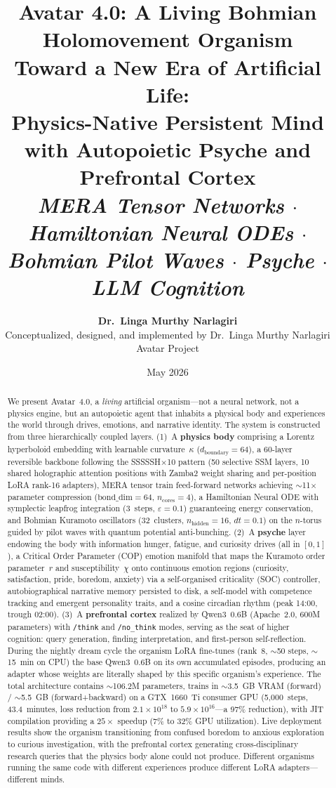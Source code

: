 \documentclass[11pt,a4paper,twocolumn]{article}
\title{\vspace{-1.5cm}\textbf{\Large Avatar 4.0: A Living Bohmian\\Holomovement Organism}\\[0.3em]
\large Toward a New Era of Artificial Life:\\Physics-Native Persistent Mind with Autopoietic Psyche and Prefrontal Cortex\\[0.2em]
\normalsize\textit{MERA Tensor Networks $\cdot$ Hamiltonian Neural ODEs $\cdot$ Bohmian Pilot Waves $\cdot$ Psyche $\cdot$ LLM Cognition}}
\author{%
\textbf{Dr.\ Linga Murthy Narlagiri}\\
Conceptualized, designed, and implemented by Dr.\ Linga Murthy Narlagiri\\
\small Avatar Project
}
\date{May 2026}
\begin{document}
\maketitle
\thispagestyle{fancy}

\begin{abstract}
We present Avatar~4.0, a \emph{living} artificial organism---not a neural network, not a physics engine, but an autopoietic agent that inhabits a physical body and experiences the world through drives, emotions, and narrative identity.
The system is constructed from three hierarchically coupled layers.
(1)~A \textbf{physics body} comprising a Lorentz hyperboloid embedding with learnable curvature~$\kappa$ ($d_{\mathrm{boundary}}=64$), a 60-layer reversible backbone following the SSSSSH$\times$10 pattern (50 selective SSM layers, 10 shared holographic attention positions with Zamba2 weight sharing and per-position LoRA rank-16 adapters), MERA tensor train feed-forward networks achieving $\sim$11$\times$ parameter compression ($\mathrm{bond\_dim}=64$, $n_{\mathrm{cores}}=4$), a Hamiltonian Neural ODE with symplectic leapfrog integration (3~steps, $\varepsilon=0.1$) guaranteeing energy conservation, and Bohmian Kuramoto oscillators (32~clusters, $n_{\mathrm{hidden}}=16$, $dt=0.1$) on the $n$-torus guided by pilot waves with quantum potential anti-bunching.
(2)~A \textbf{psyche} layer endowing the body with information hunger, fatigue, and curiosity drives (all in $[0,1]$), a Critical Order Parameter (COP) emotion manifold that maps the Kuramoto order parameter~$r$ and susceptibility~$\chi$ onto continuous emotion regions (curiosity, satisfaction, pride, boredom, anxiety) via a self-organised criticality (SOC) controller, autobiographical narrative memory persisted to disk, a self-model with competence tracking and emergent personality traits, and a cosine circadian rhythm (peak 14:00, trough 02:00).
(3)~A \textbf{prefrontal cortex} realized by Qwen3~0.6B (Apache~2.0, 600M parameters) with \texttt{/think} and \texttt{/no\_think} modes, serving as the seat of higher cognition: query generation, finding interpretation, and first-person self-reflection.
During the nightly dream cycle the organism LoRA fine-tunes (rank~8, $\sim$50 steps, $\sim$15~min on CPU) the base Qwen3~0.6B on its own accumulated episodes, producing an adapter whose weights are literally shaped by this specific organism's experience.
The total architecture contains $\sim$106.2M parameters, trains in $\sim$3.5~GB VRAM (forward) / $\sim$5.5~GB (forward+backward) on a GTX~1660~Ti consumer GPU (5{,}000~steps, 43.4~minutes, loss reduction from $2.1\times10^{18}$ to $5.9\times10^{16}$---a 97\% reduction), with JIT compilation providing a $25\times$ speedup (7\% to 32\% GPU utilization).
Live deployment results show the organism transitioning from confused boredom to anxious exploration to curious investigation, with the prefrontal cortex generating cross-disciplinary research queries that the physics body alone could not produce.
Different organisms running the same code with different experiences produce different LoRA adapters---different minds.
\end{abstract}
\end{document}
